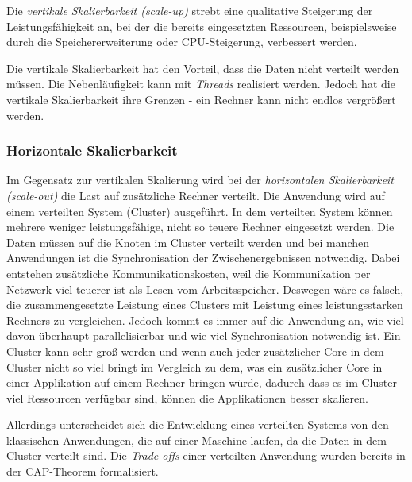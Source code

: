 Die \textit{vertikale Skalierbarkeit (scale-up)} strebt eine qualitative Steigerung der Leistungsfähigkeit an, bei der die bereits eingesetzten Ressourcen, beispielsweise durch die Speichererweiterung oder CPU-Steigerung, verbessert werden.

Die vertikale Skalierbarkeit hat den Vorteil, dass die Daten nicht verteilt werden müssen. Die Nebenläufigkeit kann mit \textit{Threads} realisiert werden. Jedoch hat die vertikale Skalierbarkeit ihre Grenzen - ein Rechner kann nicht endlos vergrößert werden. 

\subsubsection{Horizontale Skalierbarkeit}

Im Gegensatz zur vertikalen Skalierung wird bei der \textit{horizontalen Skalierbarkeit (scale-out)} die Last auf zusätzliche Rechner verteilt. Die Anwendung wird auf einem verteilten System (Cluster) ausgeführt. In dem verteilten System können mehrere weniger leistungsfähige, nicht so teuere Rechner eingesetzt werden. Die Daten müssen auf die Knoten im Cluster verteilt werden und bei manchen Anwendungen ist die Synchronisation der Zwischenergebnissen notwendig. Dabei entstehen zusätzliche Kommunikationskosten, weil die Kommunikation per Netzwerk viel teuerer ist als Lesen vom Arbeitsspeicher. Deswegen wäre es falsch, die zusammengesetzte Leistung eines Clusters mit Leistung eines leistungsstarken Rechners zu vergleichen. Jedoch kommt es immer auf die Anwendung an, wie viel davon überhaupt parallelisierbar und wie viel Synchronisation notwendig ist. Ein Cluster kann sehr groß werden und wenn auch jeder zusätzlicher Core in dem Cluster nicht so viel bringt im Vergleich zu dem, was ein zusätzlicher Core in einer Applikation auf einem Rechner bringen würde, dadurch dass es im Cluster viel Ressourcen verfügbar sind, können die Applikationen besser skalieren.

Allerdings unterscheidet sich die Entwicklung eines verteilten Systems von den klassischen Anwendungen, die auf einer Maschine laufen, da die Daten in dem Cluster verteilt sind. Die \textit{Trade-offs} einer verteilten Anwendung wurden bereits in der CAP-Theorem formalisiert.

